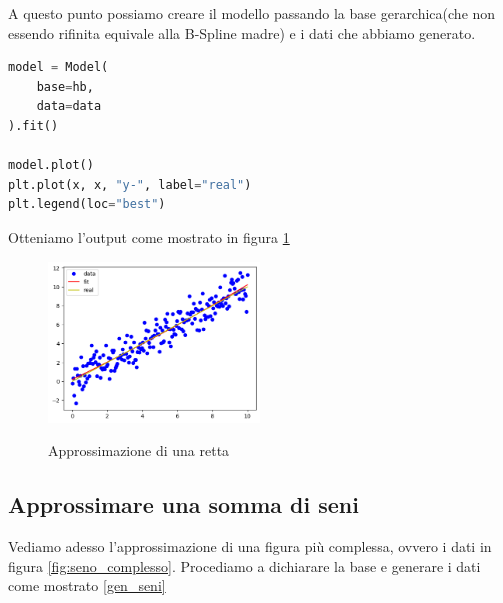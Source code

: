 \documentclass[../main.tex]{subfiles}
\begin{document}
A questo punto possiamo creare il modello passando la base gerarchica(che non essendo rifinita equivale alla B-Spline madre) e i dati
che abbiamo generato.

\begin{lstlisting}[language=Python,caption={Plot dei risultati}]
model = Model(
    base=hb,
    data=data
).fit()

model.plot()
plt.plot(x, x, "y-", label="real")
plt.legend(loc="best")
\end{lstlisting}
Otteniamo l'output come mostrato in figura \ref{fig:retta_fit}
\begin{figure}[ht]
    \caption{Approssimazione di una retta}
    \includegraphics[width=0.5\textwidth]{Immagini/esempi/retta.png}
    \centering
    \label{fig:retta_fit}
\end{figure}
\subsection{Approssimare una somma di seni}
Vediamo adesso l'approssimazione di una figura più complessa, ovvero i dati in figura \ref{fig:seno_complesso}.
Procediamo a dichiarare la base e generare i dati come mostrato \ref{gen_seni}
\end{document}

